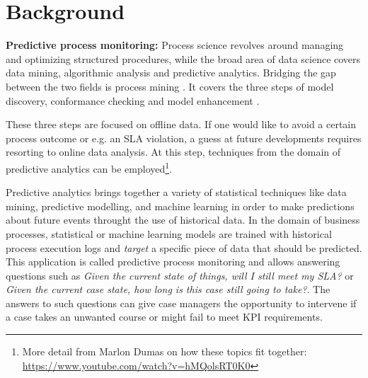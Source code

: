 \chapter{Background}\label{chap:background}
\textbf{Predictive process monitoring:}
Process science revolves around managing and optimizing structured procedures, while the broad area of data science covers data mining, algorithmic analysis and predictive analytics. 
Bridging the gap between the two fields is process mining \cite[p.18]{Aalst16}.
It covers the three steps of model discovery, conformance checking and model enhancement \cite{Aalst16}.

These three steps are focused on offline data.
If one would like to avoid a certain process outcome  or e.g. an SLA violation, a guess at future developments requires resorting to online data analysis.
At this step, techniques from the domain of predictive analytics can be employed\footnote{More detail from Marlon Dumas on how these topics fit together: \url{https://www.youtube.com/watch?v=hMQolsRT0K0}}.

Predictive analytics brings together a variety of statistical techniques like data mining, predictive modelling, and machine learning in order to make predictions about future events throught the use of historical data.
In the domain of business processes, statistical or machine learning models are trained with historical process execution logs and \textit{target} a specific piece of data that should be predicted.
This application is called predictive process monitoring and allows answering questions such as \textit{Given the current state of things, will I still meet my SLA?} or \textit{Given the current case state, how long is this case still going to take?}.
The answers to such questions can give case managers the opportunity to intervene if a case takes an unwanted course or might fail to meet KPI requirements.

